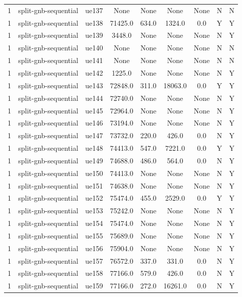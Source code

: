 \begin{table}[ht]
\begin{tabular}{|c|c|c|c|c|c|c|c|c|}
1 & split-gnb-sequential & ue137 & None & None & None & None & N & N \\
1 & split-gnb-sequential & ue138 & 71425.0 & 634.0 & 1324.0 & 0.0 & Y & Y \\
1 & split-gnb-sequential & ue139 & 3448.0 & None & None & None & N & Y \\
1 & split-gnb-sequential & ue140 & None & None & None & None & N & N \\
1 & split-gnb-sequential & ue141 & None & None & None & None & N & N \\
1 & split-gnb-sequential & ue142 & 1225.0 & None & None & None & N & Y \\
1 & split-gnb-sequential & ue143 & 72848.0 & 311.0 & 18063.0 & 0.0 & Y & Y \\
1 & split-gnb-sequential & ue144 & 72740.0 & None & None & None & N & Y \\
1 & split-gnb-sequential & ue145 & 72964.0 & None & None & None & N & Y \\
1 & split-gnb-sequential & ue146 & 73194.0 & None & None & None & N & Y \\
1 & split-gnb-sequential & ue147 & 73732.0 & 220.0 & 426.0 & 0.0 & N & Y \\
1 & split-gnb-sequential & ue148 & 74413.0 & 547.0 & 7221.0 & 0.0 & Y & Y \\
1 & split-gnb-sequential & ue149 & 74688.0 & 486.0 & 564.0 & 0.0 & N & Y \\
1 & split-gnb-sequential & ue150 & 74413.0 & None & None & None & N & Y \\
1 & split-gnb-sequential & ue151 & 74638.0 & None & None & None & N & Y \\
1 & split-gnb-sequential & ue152 & 75474.0 & 455.0 & 2529.0 & 0.0 & Y & Y \\
1 & split-gnb-sequential & ue153 & 75242.0 & None & None & None & N & Y \\
1 & split-gnb-sequential & ue154 & 75474.0 & None & None & None & N & Y \\
1 & split-gnb-sequential & ue155 & 75689.0 & None & None & None & N & Y \\
1 & split-gnb-sequential & ue156 & 75904.0 & None & None & None & N & Y \\
1 & split-gnb-sequential & ue157 & 76572.0 & 337.0 & 331.0 & 0.0 & N & Y \\
1 & split-gnb-sequential & ue158 & 77166.0 & 579.0 & 426.0 & 0.0 & N & Y \\
1 & split-gnb-sequential & ue159 & 77166.0 & 272.0 & 16261.0 & 0.0 & N & Y \\

\end{tabular}
\end{table}
